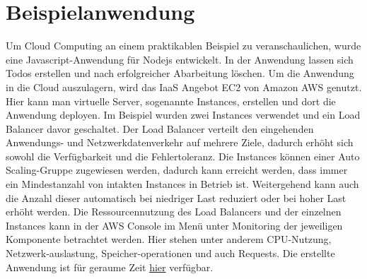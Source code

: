\section{Beispielanwendung}
Um Cloud Computing an einem praktikablen Beispiel zu veranschaulichen, wurde eine Javascript-Anwendung für Nodejs entwickelt. In der Anwendung lassen sich Todos erstellen und nach erfolgreicher Abarbeitung löschen. Um die Anwendung in die Cloud auszulagern, wird das IaaS Angebot EC2 von Amazon AWS genutzt. Hier kann man virtuelle Server, sogenannte \glqq Instances\grqq{}, erstellen und dort die Anwendung deployen. Im Beispiel wurden zwei \glqq Instances\grqq{} verwendet und ein Load Balancer davor geschaltet. Der Load Balancer verteilt den eingehenden Anwendungs- und Netzwerkdatenverkehr auf mehrere Ziele, dadurch erhöht sich sowohl die Verfügbarkeit und die Fehlertoleranz. Die \glqq Instances\grqq{} können einer Auto Scaling-Gruppe zugewiesen werden, dadurch kann erreicht werden, dass immer ein Mindestanzahl von intakten \glqq Instances\grqq{} in Betrieb ist. Weitergehend kann auch die Anzahl dieser automatisch bei niedriger Last reduziert oder bei hoher Last erhöht werden. Die Ressourcennutzung des Load Balancers und der einzelnen \glqq Instances\grqq{} kann in der \glqq AWS Console\grqq{} im Menü unter Monitoring der jeweiligen Komponente betrachtet werden. Hier stehen unter anderem CPU-Nutzung, Netzwerk-auslastung, Speicher-operationen und auch Requests. Die erstellte Anwendung ist für geraume Zeit  \href{http://test-lb-1608271566.us-east-1.elb.amazonaws.com:8080/}{hier} verfügbar. 